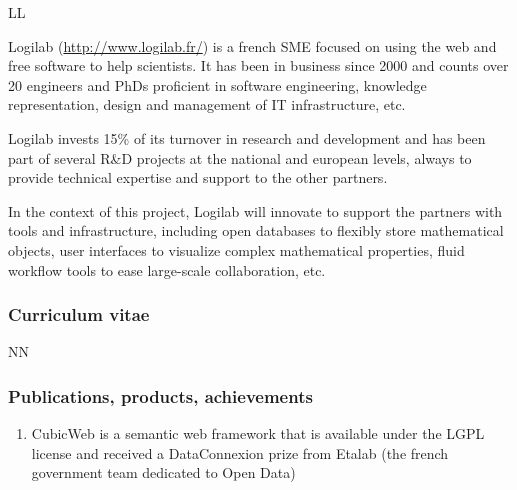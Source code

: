 \begin{sitedescription}{LL}

Logilab (\url{http://www.logilab.fr/}) is a french SME focused on using the web and free software to help
scientists. It has been in business since 2000 and counts over 20 engineers and
PhDs proficient in software engineering, knowledge representation, design and
management of IT infrastructure, etc.

Logilab invests 15\% of its turnover in research and development and has been
part of several R\&D projects at the national and european levels, always to
provide technical expertise and support to the other partners.

In the context of this project, Logilab will innovate to support the partners
with tools and infrastructure, including open databases to flexibly store
mathematical objects, user interfaces to visualize complex mathematical
properties, fluid workflow tools to ease large-scale collaboration, etc.



\subsubsection*{Curriculum vitae}








\begin{participant}[type=res,PM=30]{NN}
\end{participant}

\subsubsection*{Publications, products, achievements}

\begin{enumerate}
 \item CubicWeb is a semantic web framework that is available under the LGPL
   license and received a DataConnexion prize from Etalab (the french government
   team dedicated to Open Data)


\end{enumerate}
\end{sitedescription}
